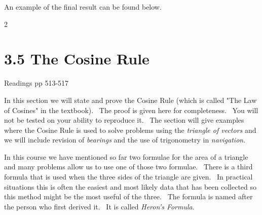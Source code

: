 An example of the final result can be found below. 

   
\setlength\fboxrule{0.01in}\setlength\fboxsep{0.2in}



\columnsep =30pt
\begin {multicols}{2}
 


\end {multicols}
 

\section{3.5 The Cosine Rule}
Readings pp 513-517 

In this section we will state and prove the Cosine Rule (which is called "The Law of Cosines" in the
textbook). \ The proof is given here for completeness. \ You will not
be tested on your ability to reproduce it. \ The section will give examples where the Cosine Rule is used to solve
problems using the \emph{triangle of vectors} and we will include revision of \emph{bearings} and the use of trigonometry
in \emph{navigation}. 

In this course we have mentioned so far two formulae for the area of a triangle and many problems
allow us to use one of those two formulae. \ There is a third formula that is used when the three sides of the
triangle are given. \ In practical situations this is often the easiest and most likely data that has been collected
so this method might be the most useful of the three. \ The formula is named after the person who first derived
it. \ It is called \emph{Heron's Formula}. 

